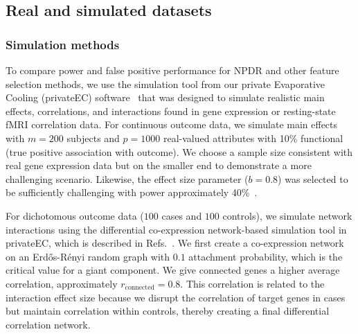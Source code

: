 \documentclass[10pt]{article}
\begin{document}
\subsection{Real and simulated datasets}
\subsubsection{Simulation methods}
To compare power and false positive performance for NPDR and other feature selection methods, we use the simulation tool from our private Evaporative Cooling (privateEC) software~\cite{le17} that was designed to simulate realistic main effects, correlations, and interactions found in gene expression or resting-state fMRI correlation data.
For continuous outcome data, we simulate main effects with $m=200$ subjects and $p=1000$ real-valued attributes with 10\% functional (true positive association with outcome).
We choose a sample size consistent with real gene expression data but on the smaller end to demonstrate a more challenging scenario.
Likewise, the effect size parameter ($b=0.8$) was selected to be sufficiently challenging with power approximately 40\%~\cite{le17}.

For dichotomous outcome data ($100$ cases and $100$ controls), we simulate network interactions using the differential co-expression network-based simulation tool in privateEC, which is described in Refs.~\cite{le17, lareau15}.
We first create a co-expression network on an Erd\H{o}s-R\'enyi random graph with $0.1$ attachment probability, which is the critical value for a giant component.
We give connected genes a higher average correlation, approximately $r_{\text{connected}}=0.8$.%
This correlation is related to the interaction effect size because we disrupt the correlation of target genes in cases but maintain correlation within controls, thereby creating a final differential correlation network.
\end{document}
